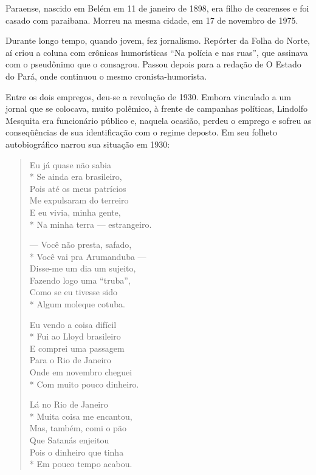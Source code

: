 Paraense, nascido em Belém em 11 de janeiro de 1898, era filho de
cearenses e foi casado com paraibana. Morreu na mesma cidade, em 17
de novembro de 1975.

 Durante longo tempo, quando jovem, fez jornalismo. Repórter da Folha
do Norte, aí criou a coluna com crônicas humorísticas “Na polícia e
nas ruas”, que assinava com o pseudônimo que o consagrou. Passou
depois para a redação de O Estado do Pará, onde continuou o mesmo
cronista-humorista.

Entre os dois empregos, deu-se a revolução de 1930. Embora vinculado a
um jornal que se colocava, muito polêmico, à frente de campanhas
políticas, Lindolfo Mesquita era funcionário público e, naquela
ocasião, perdeu o emprego e sofreu as conseqüências de sua
identificação com o regime deposto. Em seu folheto autobiográfico
narrou sua situação em 1930:

\begin{verse}
Eu já quase não sabia\\*
Se ainda era brasileiro,\\
Pois até os meus patrícios\\
Me expulsaram do terreiro\\
E eu vivia, minha gente, \\*
Na minha terra --- estrangeiro.

--- Você não presta, safado, \\*
Você vai pra Arumanduba ---\\
Disse-me um dia um sujeito,\\
Fazendo logo uma “truba”,\\
Como se eu tivesse sido\\*
Algum moleque cotuba.

Eu vendo a coisa difícil\\*
Fui ao Lloyd brasileiro\\
E comprei uma passagem\\
Para o Rio de Janeiro\\
Onde em novembro cheguei\\*
Com muito pouco dinheiro.

Lá no Rio de Janeiro\\*
Muita coisa me encantou,\\
Mas, também, comi o pão\\
Que Satanás enjeitou\\
Pois o dinheiro que tinha\\*
Em pouco tempo acabou.
\end{verse}

